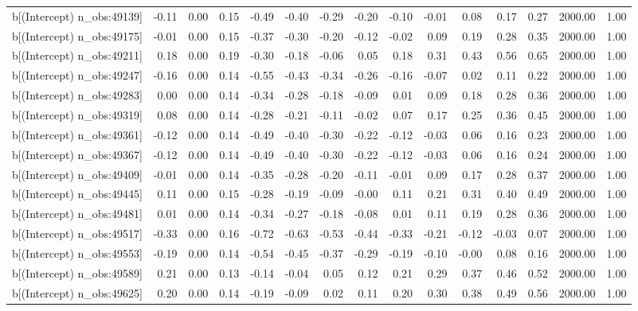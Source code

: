 \begin{table}[ht]
\begin{tabular}{rrrrrrrrrrrrrrr}
  b[(Intercept) n\_obs:49139] & -0.11 & 0.00 & 0.15 & -0.49 & -0.40 & -0.29 & -0.20 & -0.10 & -0.01 & 0.08 & 0.17 & 0.27 & 2000.00 & 1.00 \\ 
  b[(Intercept) n\_obs:49175] & -0.01 & 0.00 & 0.15 & -0.37 & -0.30 & -0.20 & -0.12 & -0.02 & 0.09 & 0.19 & 0.28 & 0.35 & 2000.00 & 1.00 \\ 
  b[(Intercept) n\_obs:49211] & 0.18 & 0.00 & 0.19 & -0.30 & -0.18 & -0.06 & 0.05 & 0.18 & 0.31 & 0.43 & 0.56 & 0.65 & 2000.00 & 1.00 \\ 
  b[(Intercept) n\_obs:49247] & -0.16 & 0.00 & 0.14 & -0.55 & -0.43 & -0.34 & -0.26 & -0.16 & -0.07 & 0.02 & 0.11 & 0.22 & 2000.00 & 1.00 \\ 
  b[(Intercept) n\_obs:49283] & 0.00 & 0.00 & 0.14 & -0.34 & -0.28 & -0.18 & -0.09 & 0.01 & 0.09 & 0.18 & 0.28 & 0.36 & 2000.00 & 1.00 \\ 
  b[(Intercept) n\_obs:49319] & 0.08 & 0.00 & 0.14 & -0.28 & -0.21 & -0.11 & -0.02 & 0.07 & 0.17 & 0.25 & 0.36 & 0.45 & 2000.00 & 1.00 \\ 
  b[(Intercept) n\_obs:49361] & -0.12 & 0.00 & 0.14 & -0.49 & -0.40 & -0.30 & -0.22 & -0.12 & -0.03 & 0.06 & 0.16 & 0.23 & 2000.00 & 1.00 \\ 
  b[(Intercept) n\_obs:49367] & -0.12 & 0.00 & 0.14 & -0.49 & -0.40 & -0.30 & -0.22 & -0.12 & -0.03 & 0.06 & 0.16 & 0.24 & 2000.00 & 1.00 \\ 
  b[(Intercept) n\_obs:49409] & -0.01 & 0.00 & 0.14 & -0.35 & -0.28 & -0.20 & -0.11 & -0.01 & 0.09 & 0.17 & 0.28 & 0.37 & 2000.00 & 1.00 \\ 
  b[(Intercept) n\_obs:49445] & 0.11 & 0.00 & 0.15 & -0.28 & -0.19 & -0.09 & -0.00 & 0.11 & 0.21 & 0.31 & 0.40 & 0.49 & 2000.00 & 1.00 \\ 
  b[(Intercept) n\_obs:49481] & 0.01 & 0.00 & 0.14 & -0.34 & -0.27 & -0.18 & -0.08 & 0.01 & 0.11 & 0.19 & 0.28 & 0.36 & 2000.00 & 1.00 \\ 
  b[(Intercept) n\_obs:49517] & -0.33 & 0.00 & 0.16 & -0.72 & -0.63 & -0.53 & -0.44 & -0.33 & -0.21 & -0.12 & -0.03 & 0.07 & 2000.00 & 1.00 \\ 
  b[(Intercept) n\_obs:49553] & -0.19 & 0.00 & 0.14 & -0.54 & -0.45 & -0.37 & -0.29 & -0.19 & -0.10 & -0.00 & 0.08 & 0.16 & 2000.00 & 1.00 \\ 
  b[(Intercept) n\_obs:49589] & 0.21 & 0.00 & 0.13 & -0.14 & -0.04 & 0.05 & 0.12 & 0.21 & 0.29 & 0.37 & 0.46 & 0.52 & 2000.00 & 1.00 \\ 
  b[(Intercept) n\_obs:49625] & 0.20 & 0.00 & 0.14 & -0.19 & -0.09 & 0.02 & 0.11 & 0.20 & 0.30 & 0.38 & 0.49 & 0.56 & 2000.00 & 1.00 \\ 

\end{tabular}
\end{table}
